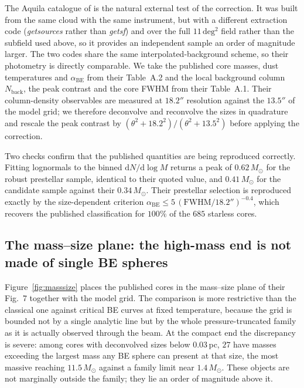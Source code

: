 \documentclass[11pt,a4paper]{article}
\newcommand{\msun}{M_{\odot}}
\begin{document}
The Aquila catalogue of \citet{Konyves+2015} is the natural external test of
the correction. It was built from the same cloud with the same instrument,
but with a different extraction code (\emph{getsources} rather than
\emph{getsf}) and over the full $11\,\mathrm{deg^2}$ field rather than the
subfield used above, so it provides an independent sample an order of
magnitude larger. The two codes share the same interpolated-background
scheme, so their photometry is directly comparable. We take the published
core masses, dust temperatures and $\alpha_{\mathrm{BE}}$ from their Table~A.2
and the local background column $N_{\mathrm{back}}$, the peak contrast and the
core FWHM from their Table~A.1. Their column-density observables are measured
at $18.2''$ resolution against the $13.5''$ of the model grid; we therefore
deconvolve and reconvolve the sizes in quadrature and rescale the peak
contrast by $(\theta^2+18.2^2)/(\theta^2+13.5^2)$ before applying the
correction.

Two checks confirm that the published quantities are being reproduced
correctly. Fitting lognormals to the binned $\mathrm{d}N/\mathrm{d}\log M$
returns a peak of $0.62\,\msun$ for the robust prestellar sample, identical to
their quoted value, and $0.41\,\msun$ for the candidate sample against their
$0.34\,\msun$. Their prestellar selection is reproduced exactly by the
size-dependent criterion
$\alpha_{\mathrm{BE}}\le5\,(\mathrm{FWHM}/18.2'')^{-0.4}$, which recovers the
published classification for $100\%$ of the $685$ starless cores.

\subsection{The mass--size plane: the high-mass end is not made of single BE spheres}
\label{sec:masssize}

Figure~\ref{fig:masssize} places the published cores in the mass--size plane
of their Fig.~7 together with the model grid. The comparison is more
restrictive than the classical one against critical BE curves at fixed
temperature, because the grid is bounded not by a single analytic line but by
the whole pressure-truncated family as it is actually observed through the
beam. At the compact end the discrepancy is severe: among cores with
deconvolved sizes below $0.03$\,pc, $27$ have masses exceeding the largest
mass any BE sphere can present at that size, the most massive reaching
$11.5\,\msun$ against a family limit near $1.4\,\msun$. These objects are not
marginally outside the family; they lie an order of magnitude above it.
\end{document}
